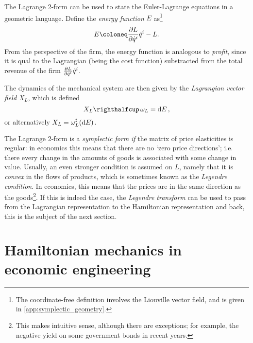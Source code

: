 The Lagrange 2-form can be used to state the Euler-Lagrange equations in a geometric language. Define the \emph{energy function} $E$ as\footnote{The coordinate-free definition involves the Liouville vector field, and is given in \cref{app:symplectic_geometry}.}
\begin{equation}
    E \coloneq \pdv{L}{\dot{q}^i}\dot{q}^i - L.
\end{equation}
From the perspective of the firm, the energy function is analogous to \emph{profit}, since it is qual to the Lagrangian (being the cost function) substracted from the total revenue of the firm $\pdv{L}{\dot{q}^i}\dot{q}^i$.
    
The dynamics of the mechanical system are then given by the \emph{Lagrangian vector field} $X_L$, which is defined 
\begin{equation}
    \intpr{X_L}{\omega_L} = \dd{E}, 
\end{equation}
or alternatively $X_L = \omega_L^\sharp(\dd{E})$.

The Lagrange 2-form is a \emph{symplectic form} \emph{if} the matrix of price elasticities is regular: in economics this means that there are no `zero price directions'; i.e. there every change in the amounts of goods is associated with some change in value. Usually, an even stronger condition is assumed on $L$, namely that it is \emph{convex} in the flows of products, which is sometimes known as the \emph{Legendre condition}. In economics, this means that the prices are in the same direction as the goods\footnote{This makes intuitive sense, although there are exceptions; for example, the negative yield on some government bonds in recent years.}. If this is indeed the case, the \emph{Legendre transform} can be used to pass from the Lagrangian representation to the Hamiltonian representation and back, this is the subject of the next section. 

\section{Hamiltonian mechanics in economic engineering}
